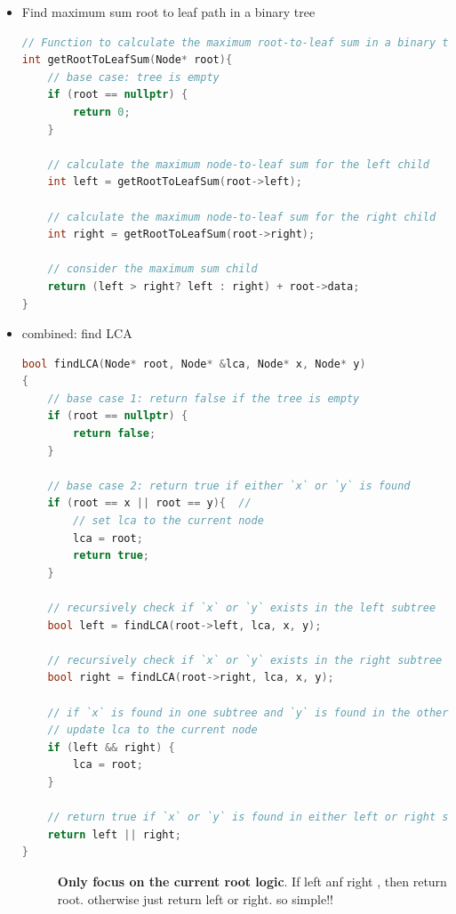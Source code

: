 \documentclass[a4paper,11pt,twoside]{book}
\begin{document}
\begin{itemize}
	\item Find maximum sum root to leaf path in a binary tree
\begin{lstlisting}[frame=single, language=c++]
// Function to calculate the maximum root-to-leaf sum in a binary tree
int getRootToLeafSum(Node* root){
	// base case: tree is empty
	if (root == nullptr) {
		return 0;
	}
	
	// calculate the maximum node-to-leaf sum for the left child
	int left = getRootToLeafSum(root->left);
	
	// calculate the maximum node-to-leaf sum for the right child
	int right = getRootToLeafSum(root->right);
	
	// consider the maximum sum child
	return (left > right? left : right) + root->data;
}	
\end{lstlisting}

\item combined:
find LCA
\begin{lstlisting}[frame=single, language=c++]
bool findLCA(Node* root, Node* &lca, Node* x, Node* y)
{
	// base case 1: return false if the tree is empty
	if (root == nullptr) {
		return false;
	}
	
	// base case 2: return true if either `x` or `y` is found
	if (root == x || root == y){  // 
		// set lca to the current node
		lca = root;
		return true;
	}
	
	// recursively check if `x` or `y` exists in the left subtree
	bool left = findLCA(root->left, lca, x, y);
	
	// recursively check if `x` or `y` exists in the right subtree
	bool right = findLCA(root->right, lca, x, y);
	
	// if `x` is found in one subtree and `y` is found in the other subtree,
	// update lca to the current node
	if (left && right) {
		lca = root;
	}
	
	// return true if `x` or `y` is found in either left or right subtree
	return left || right;
}
\end{lstlisting}
\begin{description}
	\item[] \textbf{Only focus on the current root logic}. If left anf right , then return root. otherwise just return left or right.  so simple!!
\end{description}

\end{itemize}
\end{document}
